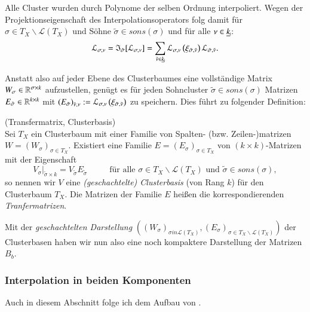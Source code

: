     Alle Cluster wurden durch Polynome der selben Ordnung interpoliert. Wegen der Projektionseigenschaft des Interpolationsoperators folg damit für $\sigma \in T_X \backslash \mathcal{L}\left(T_X\right)$ 
    und Söhne $\tilde \sigma \in sons\left(\sigma\right)$ und für alle $\nu \in \haken{k}$:
    \begin{equation*}
      \lag_\inds{\nu} = \mathfrak{I}_{\tilde \sigma}[\lag_\inds{\nu}] = \sum_{\tilde \nu \in \haken{k}} \lag_\inds{\nu}\left(\xi_{\tilde \sigma,\tilde \nu}\right) \lag_{\tilde \sigma,\tilde \nu}.
    \end{equation*}
    
    Anstatt also auf jeder Ebene des Clusterbaumes eine vollständige Matrix $W_\sigma \in \mathbb{R}^{\sigma \times k}$ aufzustellen, genügt es für jeden Sohncluster $\tilde \sigma \in sons\left(\sigma\right)$
    Matrizen $E_{\tilde \sigma} \in \mathbb{R}^{k \times k}$ mit $\left(E_{\tilde \sigma}\right)_{\tilde\nu , \nu} := \mathcal{L}_{\sigma, \nu}\left(\xi_{\tilde \sigma, \tilde \nu}\right)$ zu speichern. Dies führt zu folgender Definition:
    
    \begin{defn}
      (Transfermatrix, Clusterbasis)\\
      Sei $T_X$ ein Clusterbaum mit einer Familie von Spalten- (bzw. Zeilen-)matrizen $W = \left(W_\sigma\right)_{\sigma \in T_X}$. Existiert eine Familie $E = \left(E_\sigma\right)_{\sigma \in T_X}$ von 
      $\left(k \times k\right)$-Matrizen mit der
      Eigenschaft
      \begin{equation*}
	\left. V_\sigma \right|_{\tilde \sigma \times k} = V_{\tilde \sigma} E_{\tilde \sigma} \ \ \ \ \ \ \ \ \ \ \ \ \text{für alle } 
	\sigma \in T_X \backslash \mathcal{L}\left(T_X\right) \text{ und } \tilde \sigma \in sons\left(\sigma\right),
      \end{equation*}
      so nennen wir $V$ eine \textit{(geschachtelte) Clusterbasis} (von Rang $k$) für den Clusterbaum $T_X$. Die Matrizen der Familie $E$ heißen die korrespondierenden \textit{Tranfermatrizen}.
      \citep{nichtlokop}
    \end{defn}

    Mit der \textit{geschachtelten Darstellung} $\left(\left(W_\sigma\right)_{\sigma in \mathcal{L}\left(T_X\right)} , \left(E_\sigma\right)_{\sigma \in T_X \backslash \mathcal{L}\left(T_X\right)}\right)$ der Clusterbasen haben wir nun also eine 
    noch kompaktere Darstellung der Matrizen $B_b$.
    

    \subsubsection{Interpolation in beiden Komponenten}
    Auch in diesem Abschnitt folge ich dem Aufbau von \citet{nichtlokop}.
    
